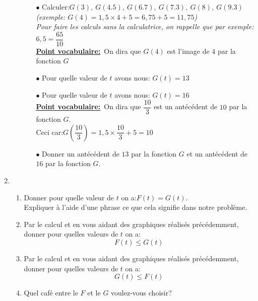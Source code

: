 \documentclass[a4paper,11pt]{article}
\theoremstyle{definition}
\newtheorem{exo}{Exercice}
\begin{document}
\begin{enumerate}
\begin{enumerate}
			\begin{itemize}
				\item[$\bullet$] Calculer:\quad $G(3),~G(4.5),~G(6.7),~G(7.3),~G(8),~G(9.3)$\\
				\textit{	(exemple: $G(4)=1,5\times 4+5=6,75+5=11,75$)}\\
				\textit{Pour faire les calculs sans la calculatrice, on rappelle que par exemple: \quad $6,5= \dfrac{65}{10}$}\\
				\textbf{\underline{Point vocabulaire:}}~On dira que $G(4)$ est l'image de $4$ par la fonction $G$
				
				\item[$\bullet$] Pour quelle valeur de $t$ avons nous: $ G(t)=13$ 
				\item[$\bullet$] Pour quelle valeur de $t$ avons nous: $ G(t)=16$ \\
				\textbf{\underline{Point vocabulaire:}}~On dira que $\dfrac{10}{3}$ est un antécédent de $10$ par la fonction $G$.\\ Ceci car:\quad $G(\dfrac{10}{3}) = 1,5\times\dfrac{10}{3} +5=10$
				\item[$\bullet$] Donner un antécédent de $13$ par la fonction $G$ et un antécédent de $16$ par la fonction $G$.
			\end{itemize} 
		\end{enumerate}	  

\item\begin{enumerate}
	\item Donner pour quelle valeur de $t$ on a:\quad $F(t)=G(t)$.\\
	Expliquer à l'aide d'une phrase ce que cela signifie dans notre problème.	
	\item Par le calcul et en vous aidant des graphiques réalisés précédemment, donner pour quelles valeurs de $t$ on a:
	$$F(t)\leq G(t)$$
	\item Par le calcul et en vous aidant des graphiques réalisés précédemment, donner pour quelles valeurs de $t$ on a:
	$$G(t)\leq F(t)$$ 
	\item Quel café entre le $F$ et le $G$ voulez-vous choisir?	
\end{enumerate}
\end{enumerate}


\newpage

  
\end{document}
